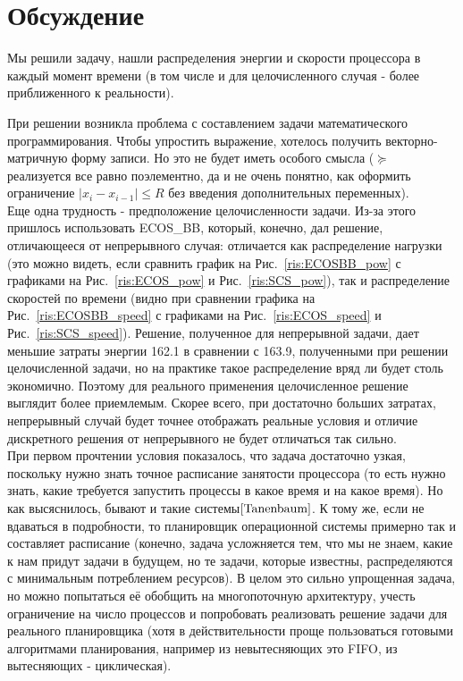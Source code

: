 \documentclass{article}
\begin{document}
\section{Обсуждение}

Мы решили задачу, нашли распределения энергии и скорости процессора в каждый момент времени (в том числе и для целочисленного случая - более приближенного к реальности).

При решении возникла проблема с составлением задачи математического программирования. Чтобы упростить выражение, хотелось получить векторно-матричную форму записи. Но это не будет иметь особого смысла ($\succeq$ реализуется все равно поэлементно, да и не очень понятно, как оформить ограничение $|x_i-x_{i-1}| \le R$ без введения дополнительных переменных). \\

Еще одна трудность - предположение целочисленности задачи. Из-за этого пришлось использовать ECOS\_BB, который, конечно, дал решение, отличающееся от непрерывного случая: отличается как распределение нагрузки (это можно видеть, если сравнить график на Рис.~\ref{ris:ECOSBB_pow} с графиками на Рис.~\ref{ris:ECOS_pow} и Рис.~\ref{ris:SCS_pow}), так и распределение скоростей по времени (видно при сравнении графика на Рис.~\ref{ris:ECOSBB_speed} с графиками на Рис.~\ref{ris:ECOS_speed} и Рис.~\ref{ris:SCS_speed}). Решение, полученное для непрерывной задачи, дает меньшие затраты энергии 162.1 в сравнении с 163.9, полученными при решении целочисленной задачи, но на практике такое распределение вряд ли будет столь экономично. Поэтому для реального применения целочисленное решение выглядит более приемлемым. Скорее всего, при достаточно больших затратах, непрерывный случай будет точнее отображать реальные условия и отличие дискретного решения от непрерывного не будет отличаться так сильно. \\

При первом прочтении условия показалось, что задача достаточно узкая, поскольку нужно знать точное расписание занятости процессора (то есть нужно знать, какие требуется запустить процессы в какое время и на какое время). Но как высяснилось, бывают и такие системы$\cite{Tanenbaum}$. К тому же, если не вдаваться в подробности, то планировщик операционной системы примерно так и составляет расписание (конечно, задача усложняется тем, что мы не знаем, какие к нам придут задачи в будущем, но те задачи, которые известны, распределяются с минимальным потреблением ресурсов). В целом это сильно упрощенная задача, но можно попытаться её обобщить на многопоточную архитектуру, учесть ограничение на число процессов и попробовать реализовать решение задачи для реального планировщика (хотя в действительности проще пользоваться готовыми алгоритмами планирования, например из невытесняющих это FIFO, из вытесняющих - циклическая).\\
\end{document}

